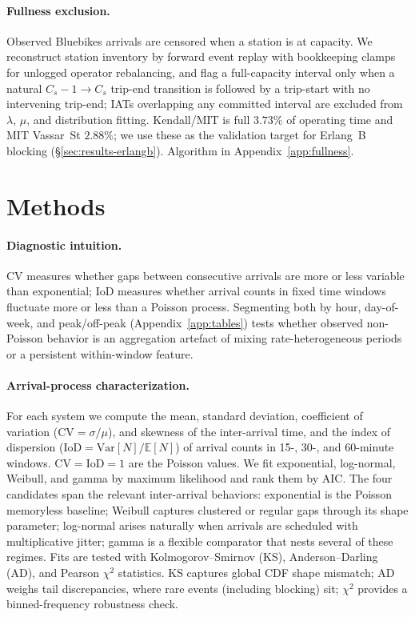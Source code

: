 \paragraph{Fullness exclusion.} Observed Bluebikes arrivals are censored when a station is at capacity. We reconstruct station inventory by forward event replay with bookkeeping clamps for unlogged operator rebalancing, and flag a full-capacity interval only when a natural $C_s-1 \to C_s$ trip-end transition is followed by a trip-start with no intervening trip-end; IATs overlapping any committed interval are excluded from $\lambda$, $\mu$, and distribution fitting. Kendall/MIT is full $3.73\%$ of operating time and MIT Vassar~St $2.88\%$; we use these as the validation target for Erlang~B blocking (\S\ref{sec:results-erlangb}). Algorithm in Appendix~\ref{app:fullness}.

\section{Methods}\label{sec:methods}

\paragraph{Diagnostic intuition.} CV measures whether gaps between consecutive arrivals are more or less variable than exponential; IoD measures whether arrival counts in fixed time windows fluctuate more or less than a Poisson process. Segmenting both by hour, day-of-week, and peak/off-peak (Appendix~\ref{app:tables}) tests whether observed non-Poisson behavior is an aggregation artefact of mixing rate-heterogeneous periods or a persistent within-window feature.

\paragraph{Arrival-process characterization.} For each system we compute the mean, standard deviation, coefficient of variation ($\mathrm{CV} = \sigma/\mu$), and skewness of the inter-arrival time, and the index of dispersion ($\mathrm{IoD} = \mathrm{Var}[N]/\mathbb{E}[N]$) of arrival counts in 15-, 30-, and 60-minute windows. $\mathrm{CV} = \mathrm{IoD} = 1$ are the Poisson values. We fit exponential, log-normal, Weibull, and gamma by maximum likelihood and rank them by AIC. The four candidates span the relevant inter-arrival behaviors: exponential is the Poisson memoryless baseline; Weibull captures clustered or regular gaps through its shape parameter; log-normal arises naturally when arrivals are scheduled with multiplicative jitter; gamma is a flexible comparator that nests several of these regimes. Fits are tested with Kolmogorov--Smirnov (KS), Anderson--Darling (AD), and Pearson $\chi^2$ statistics. KS captures global CDF shape mismatch; AD weighs tail discrepancies, where rare events (including blocking) sit; $\chi^2$ provides a binned-frequency robustness check.

